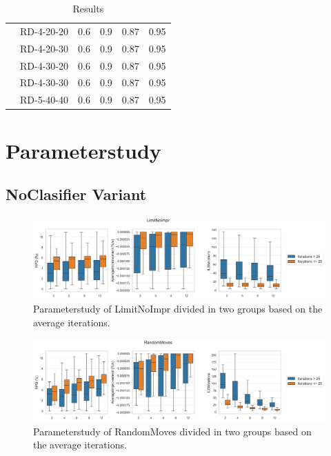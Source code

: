 \begin{table}[ht]
\begin{tabular}{c c c c c c}
                                        & RD-4-20-20 & 0.6             & 0.9         & 0.87     & 0.95     \\
                                        & RD-4-20-30 & 0.6             & 0.9         & 0.87     & 0.95     \\
                                        & RD-4-30-20 & 0.6             & 0.9         & 0.87     & 0.95     \\
                                        & RD-4-30-30 & 0.6             & 0.9         & 0.87     & 0.95     \\
                                        & RD-5-40-40 & 0.6             & 0.9         & 0.87     & 0.95     \\
        \bottomrule
    \end{tabular}
    \caption{Results}
    \label{tab:dataset_model_selection_randomStrategy}
\end{table}

\clearpage


\section{Parameterstudy}

\subsection{NoClasifier Variant}
\label{app:subsec:parameterstudy_noclassifier}

\begin{figure}[!ht]
    \centering
    \includegraphics[width=\textwidth]{pictures/LimitNoImpr_base_parameter_study.png}
    \caption{Parameterstudy of LimitNoImpr divided in two groups based on the average iterations.}
    \label{fig:parameterstudy_NoClassifier_limitNoImpr}
\end{figure}

\begin{figure}[!ht]
    \centering
    \includegraphics[width=\textwidth]{pictures/RandomMoves_base_parameter_study.png}
    \caption{Parameterstudy of RandomMoves divided in two groups based on the average iterations.}
    \label{fig:parameterstudy_NoClassifier_RandomMoves}
\end{figure}

